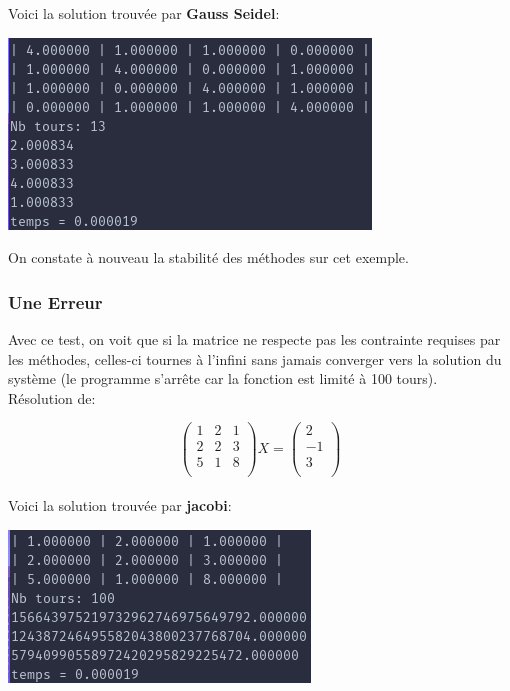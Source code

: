 \documentclass[a4paper]{article}
\begin{document}
Voici la solution trouvée par \textbf{Gauss Seidel}:

\includegraphics[scale=0.5]{./img/gauss_seidel/g_e_ex_1_mod.png}

On constate à nouveau la stabilité des méthodes sur cet exemple.

\subsubsection{Une Erreur}

Avec ce test, on voit que si la matrice ne respecte pas les contrainte requises
par les méthodes, celles-ci tournes à l'infini sans jamais converger vers la
solution du système (le programme s'arrête car la fonction est limité à 100 tours).\\

Résolution de:

\[
\begin{pmatrix}
  1 & 2 & 1\\
  2 & 2 & 3\\
  5 & 1 & 8\\
\end{pmatrix} X =
\begin{pmatrix}
  2\\
  -1\\
  3\\
\end{pmatrix}
\]\\

Voici la solution trouvée par \textbf{jacobi}:

\includegraphics[scale=0.5]{./img/jacobi/jac_fail.png}
\end{document}
